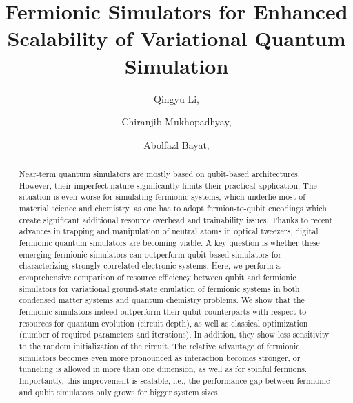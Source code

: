\documentclass[aps, prx, reprint, superscriptaddress]{revtex4-2}
\begin{document}

\title{Fermionic Simulators for Enhanced Scalability of Variational Quantum Simulation} 

\author{Qingyu Li,}
\author{Chiranjib Mukhopadhyay,}
\author{Abolfazl Bayat,}

\begin{abstract}
Near-term quantum simulators are mostly based on qubit-based architectures. However, their imperfect nature significantly limits their practical application. The situation is even worse for simulating fermionic systems, which underlie most of material science and chemistry, as one has to adopt fermion-to-qubit encodings which create significant additional resource overhead and trainability issues. Thanks to recent advances in trapping and manipulation of neutral atoms in optical tweezers, digital fermionic quantum simulators are becoming viable. A key question is whether these emerging fermionic simulators can outperform qubit-based simulators for characterizing strongly correlated electronic systems.  Here, we perform a comprehensive comparison of resource efficiency between qubit and fermionic simulators for variational ground-state emulation of fermionic systems in both condensed matter systems and quantum chemistry problems. We show that the fermionic simulators indeed outperform their qubit counterparts with respect to resources for quantum evolution (circuit depth), as well as classical optimization (number of required parameters and iterations). In addition, they show less sensitivity to the random initialization of the circuit. The relative advantage of fermionic simulators becomes even more pronounced as interaction becomes stronger,  or tunneling is allowed in more than one dimension, as well as for spinful fermions. Importantly, this improvement is scalable, i.e., the performance gap between fermionic and qubit simulators only grows for bigger system sizes. 
\end{abstract} 
\end{document}
